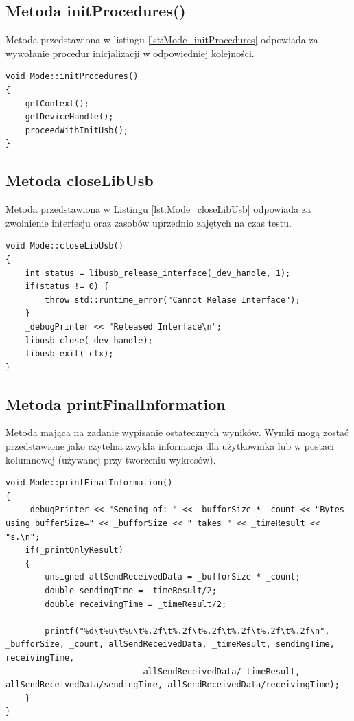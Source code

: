 \documentclass{BscUS}
\begin{document}
\subsection{Metoda initProcedures()}
Metoda przedstawiona w listingu \ref{lst:Mode_initProcedures} odpowiada za wywołanie procedur inicjalizacji w odpowiedniej kolejności.
\begin{lstlisting}[caption={Metoda Mode::initProcedures()},label={lst:Mode_initProcedures}]
void Mode::initProcedures()
{
	getContext(); 
	getDeviceHandle();
	proceedWithInitUsb();
}
\end{lstlisting}
\subsection{Metoda closeLibUsb}
Metoda przedstawiona w Listingu \ref{lst:Mode_closeLibUsb} odpowiada za zwolnienie interfesju oraz zasobów uprzednio zajętych na czas testu.
\begin{lstlisting}[caption={Metoda Mode::closeLibUsb()},label={lst:Mode_closeLibUsb}]
void Mode::closeLibUsb()
{
	int status = libusb_release_interface(_dev_handle, 1); 
	if(status != 0) {
		throw std::runtime_error("Cannot Relase Interface");
	}
	_debugPrinter << "Released Interface\n";
	libusb_close(_dev_handle);
	libusb_exit(_ctx); 
}
\end{lstlisting}


\subsection{Metoda printFinalInformation}
Metoda mająca na zadanie wypisanie ostatecznych wyników. Wyniki mogą zostać przedstawione jako czytelna zwykła informacja dla użytkownika lub w postaci kolumnowej (używanej przy tworzeniu wykresów).
\begin{lstlisting}[caption={Metoda Mode::printFinalInformation()},label={lst:Mode_printFinalInformation}]
void Mode::printFinalInformation()
{
	_debugPrinter << "Sending of: " << _bufforSize * _count << "Bytes using bufferSize=" << _bufforSize << " takes " << _timeResult << "s.\n";
	if(_printOnlyResult)
	{
		unsigned allSendReceivedData = _bufforSize * _count;
		double sendingTime = _timeResult/2;
		double receivingTime = _timeResult/2;

		printf("%d\t%u\t%u\t%.2f\t%.2f\t%.2f\t%.2f\t%.2f\t%.2f\n", _bufforSize, _count, allSendReceivedData, _timeResult, sendingTime, receivingTime,
							allSendReceivedData/_timeResult, allSendReceivedData/sendingTime, allSendReceivedData/receivingTime);
	}
}
\end{lstlisting}
\end{document}
